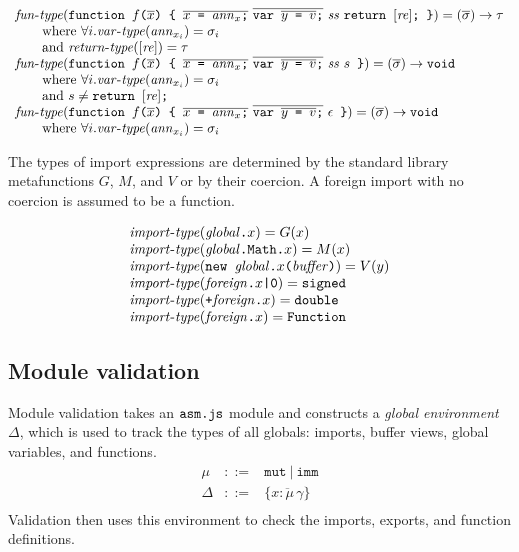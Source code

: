 \documentclass{article}
\newcommand{\imm}{\mathtt{imm}}
\newcommand{\mut}{\mathtt{mut}}
\newcommand{\funcall}[2]{{#1}\mathjs{(}{#2}\mathjs{)}}
\newcommand{\funtype}{\mathit{fun}\mbox{-}\mathit{type}}
\newcommand{\vartype}{\mathit{var}\mbox{-}\mathit{type}}
\newcommand{\rettype}{\mathit{return}\mbox{-}\mathit{type}}
\newcommand{\imptype}{\mathit{import}\mbox{-}\mathit{type}}
\newcommand{\funty}[2]{({#1}) \rightarrow {#2}}
\newcommand{\seq}[1]{\overline{{#1}}}
\newcommand{\mathjs}[1]{\mbox{\texttt{{#1}}}}
\newcommand{\return}[1]{\mathjs{return }{#1}\mathjs{;}}
\newcommand{\fun}[3]{\mathjs{function }{#1}\mathjs{(}{#2}\mathjs{) \char123{} }{#3}\mathjs{ \char125{}}}
\newcommand{\var}[1]{\mathjs{var }{#1}\mathjs{;}}
\newcommand{\signed}{\mathtt{signed}}
\newcommand{\double}{\mathtt{double}}
\newcommand{\void}{\mathtt{void}}
\newcommand{\Fun}{\mathtt{Function}}
\begin{document}
\[
\begin{array}{l}
\funtype(\fun{f}{\seq{x}}{\seq{x\mathjs{ = }\mathit{ann}_x\mathjs{;}}\ \seq{\var{\seq{y\mathjs{ = }v}}}\ \mathit{ss}\ \return{[\mathit{re}]}}) = \funty{\seq{\sigma}}{\tau} \\
\qquad \mbox{where } \forall i . \vartype(\mathit{ann}_{x_i}) = \sigma_i \\
\qquad \mbox{and } \rettype([\mathit{re}]) = \tau \\
\funtype(\fun{f}{\seq{x}}{\seq{x\mathjs{ = }\mathit{ann}_x\mathjs{;}}\ \seq{\var{\seq{y\mathjs{ = }v}}}\ \mathit{ss}\ s}) = \funty{\seq{\sigma}}{\void} \\
\qquad \mbox{where } \forall i . \vartype(\mathit{ann}_{x_i}) = \sigma_i \\
\qquad \mbox{and } s \not= \return{[\mathit{re}]} \\
\funtype(\fun{f}{\seq{x}}{\seq{x\mathjs{ = }\mathit{ann}_x\mathjs{;}}\ \seq{\var{\seq{y\mathjs{ = }v}}}\ \epsilon}) = \funty{\seq{\sigma}}{\void} \\
\qquad \mbox{where } \forall i . \vartype(\mathit{ann}_{x_i}) = \sigma_i \\
\end{array}
\]

The types of import expressions are determined by the standard library
metafunctions $G$, $M$, and $V$ or by their coercion. A foreign import
with no coercion is assumed to be a function.

\[
\begin{array}{l}
\imptype(\mathit{global}\mathjs{.}x) = G(x) \\
\imptype(\mathit{global}\mathjs{.Math.}x) = M(x) \\
\imptype(\mathjs{new }\funcall{\mathit{global}\mathjs{.}x}{\mathit{buffer}}) = V(y) \\
\imptype(\mathit{foreign}\mathjs{.}x\mathjs{|0}) = \signed \\
\imptype(\mathjs{+}\mathit{foreign}\mathjs{.}x) = \double \\
\imptype(\mathit{foreign}\mathjs{.}x) = \Fun \\
\end{array}
\]

\subsection{Module validation}

Module validation takes an $\mathjs{asm.js}$ module and constructs a
{\it global environment} $\Delta$, which is used to track the types of
all globals: imports, buffer views, global variables, and functions.
\[
\begin{array}{rcl}
\mu    & ::= & \mut ~|~ \imm \\
\Delta & ::= & \{ \seq{x : \mu\,\gamma} \} \\
\end{array}
\]
Validation then uses this environment to check the imports, exports,
and function definitions.
\end{document}
